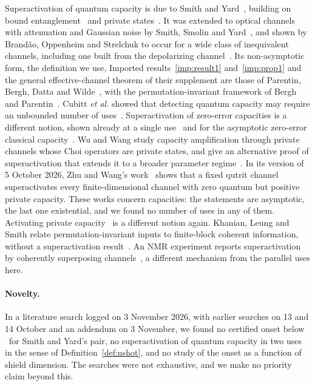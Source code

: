\documentclass[aps,pra,twocolumn,superscriptaddress,nofootinbib,longbibliography,floatfix]{revtex4-2}
\begin{document}
Superactivation of quantum capacity is due to Smith and Yard~\cite{smith2008quantum}, building on bound entanglement~\cite{horodecki1998mixed} and private states~\cite{horodecki2005secure}. It was extended to optical channels with attenuation and Gaussian noise by Smith, Smolin and Yard~\cite{smith2011gaussian}, and shown by Brand\~ao, Oppenheim and Strelchuk to occur for a wide class of inequivalent channels, including one built from the depolarizing channel~\cite{brandao2012noise}. Its non-asymptotic form, the definition we use, Imported results~\ref{imp:result1} and~\ref{imp:prop1} and the general effective-channel theorem of their supplement are those of Parentin, Bergh, Datta and Wilde~\cite{parentin2026onset}, with the permutation-invariant framework of Bergh and Parentin~\cite{bergh2026permutation}. Cubitt \textit{et al.} showed that detecting quantum capacity may require an unbounded number of uses~\cite{cubitt2015unbounded}. Superactivation of zero-error capacities is a different notion, shown already at a single use~\cite{duan2009superactivation} and for the asymptotic zero-error classical capacity~\cite{cubitt2011superactivation}. Wu and Wang study capacity amplification through private channels whose Choi operators are private states, and give an alternative proof of superactivation that extends it to a broader parameter regime~\cite{wu2025quantum}. In its version of 5 October 2026, Zhu and Wang's work~\cite{zhu2026incapacity} shows that a fixed qutrit channel superactivates every finite-dimensional channel with zero quantum but positive private capacity. These works concern capacities: the statements are asymptotic, the last one existential, and we found no number of uses in any of them. Activating private capacity~\cite{zhu2026private,g2026private} is a different notion again. Khanian, Leung and Smith relate permutation-invariant inputs to finite-block coherent information, without a superactivation result~\cite{khanian2026permutation}. An NMR experiment reports superactivation by coherently superposing channels~\cite{bhargava2026noise}, a different mechanism from the parallel uses here.

\paragraph*{Novelty.} In a literature search logged on 3 November 2026, with earlier searches on 13 and 14 October and an addendum on 3 November, we found no certified onset below \PubN\ for Smith and Yard's pair, no superactivation of quantum capacity in two uses in the sense of Definition~\ref{def:nshot}, and no study of the onset as a function of shield dimension. The searches were not exhaustive, and we make no priority claim beyond this.
\end{document}
